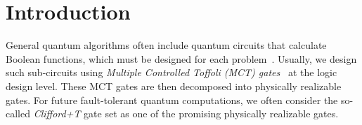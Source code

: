 \section{Introduction}






General quantum algorithms often include quantum circuits that
calculate Boolean functions, which must be
designed for each problem~\cite{yamashita2008ddmf}. Usually, we design
such sub-circuits using {\it Multiple Controlled Toffoli (MCT) gates}~\cite{barenco1995elementary} at the logic design level. These MCT gates are
then decomposed into physically realizable gates. For future
fault-tolerant quantum computations, we often consider the so-called
{\it Clifford+T} gate set as one of the promising physically realizable
gates.



